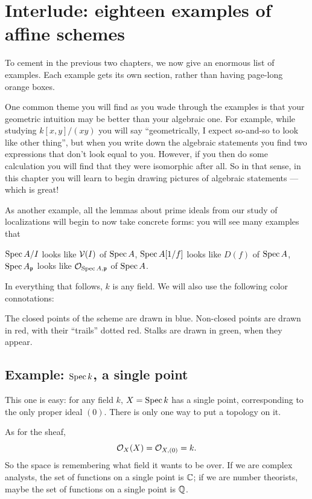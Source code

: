 \chapter{Interlude: eighteen examples of affine schemes}
\label{ch:spec_examples}
To cement in the previous two chapters,
we now give an enormous list of examples.
Each example gets its own section,
rather than having page-long orange boxes.

One common theme you will find as you wade through
the examples is that your geometric intuition may
be better than your algebraic one.
For example, while studying $k[x,y] / (xy)$ you will say
``geometrically, I expect so-and-so to look like other thing'',
but when you write down the algebraic statements
you find two expressions that don't look equal to you.
However, if you then do some calculation you will
find that they were isomorphic after all.
So in that sense, in this chapter you will learn to begin drawing
pictures of algebraic statements --- which is great!

As another example, all the lemmas about
prime ideals from our study of localizations
will begin to now take concrete forms:
you will see many examples that
\begin{itemize}
	\ii $\operatorname{Spec} A/I$ looks like $\mathcal V(I)$ of $\operatorname{Spec} A$,
	\ii $\operatorname{Spec} A[1/f]$ looks like $D(f)$ of $\operatorname{Spec} A$,
	\ii $\operatorname{Spec} A_\mathfrak p$ looks like $\mathcal O_{\operatorname{Spec} A, \mathfrak p}$ of $\operatorname{Spec} A$.
\end{itemize}

In everything that follows, $k$ is any field.
We will also use the following color connotations:
\begin{itemize}
	\ii The closed points of the scheme are drawn in blue.
	\ii Non-closed points are drawn in red,
	with their ``trails'' dotted red.
	\ii Stalks are drawn in green, when they appear.
\end{itemize}


\section{Example: $\operatorname{Spec} k$, a single point}
This one is easy: for any field $k$,
$X = \operatorname{Spec} k$ has a single point,
corresponding to the only proper ideal $(0)$.
There is only one way to put a topology on it.

As for the sheaf,
\[ \mathcal O_X(X) = \mathcal O_{X,(0)} = k. \]
So the space is remembering what field it wants to be over.
If we are complex analysts,
the set of functions on a single point is $\mathbb C$;
if we are number theorists,
maybe the set of functions on a single point is $\mathbb Q$.


